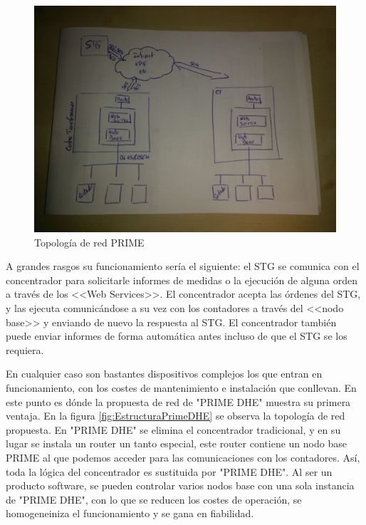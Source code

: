 \begin{figure}[htbp]
	\centering
	\includegraphics[width=\textwidth]{Img/boceto_estructura_prime.jpg}
	\caption{Topología de red PRIME}
	\label{fig:EstructuraPRIME}
\end{figure}

A grandes rasgos su funcionamiento sería el siguiente: el STG se comunica con el concentrador para solicitarle informes de medidas o la ejecución de alguna orden a través de los <<Web Services>>. El concentrador acepta las órdenes del STG, y las ejecuta comunicándose a su vez con los contadores a través del <<nodo base>> y enviando de nuevo la respuesta al STG. El concentrador también puede enviar informes de forma automática antes incluso de que el STG se los requiera.

En cualquier caso son bastantes dispositivos complejos los que entran en funcionamiento, con los costes de mantenimiento e instalación que conllevan. En este punto es dónde la propuesta de red de "PRIME DHE" muestra su primera ventaja. En la figura \ref{fig:EstructuraPrimeDHE} se observa la topología de red propuesta. En "PRIME DHE" se elimina el concentrador tradicional, y en su lugar se instala un router un tanto especial, este router contiene un nodo base PRIME al que podemos acceder para las comunicaciones con los contadores. Así, toda la lógica del concentrador es sustituida por "PRIME DHE". Al ser un producto software, se pueden controlar varios nodos base con una sola instancia de "PRIME DHE", con lo que se reducen los costes de operación, se homogeneiniza el funcionamiento y se gana en fiabilidad.

